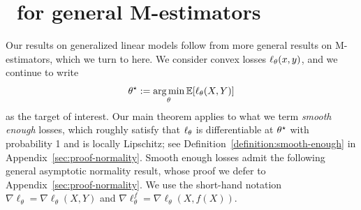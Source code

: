 
\newcommand{\lipobj}{M}

\section{\ppipptitle~for general M-estimators}
\label{sec:ppipp-m-estimation}





Our results on generalized linear models follow from more general
results on M-estimators, which we turn to here. We consider convex
losses $\ell_\theta(x, y)$, and we continue to write
\begin{equation*}
  \theta^\star := \operatorname*{arg\,min}_\theta \mathbb{E} [\ell_\theta(X,Y)]
\end{equation*}
as the target of interest.
%
Our main theorem applies to what we term \emph{smooth enough} losses, which
roughly satisfy that $\ell_\theta$ is differentiable at $\theta^\star$ with
probability 1 and is locally Lipschitz; see
Definition~\ref{definition:smooth-enough} in
Appendix~\ref{sec:proof-normality}.
%
%
Smooth enough losses admit the following general asymptotic normality
result, whose proof we defer to Appendix~\ref{sec:proof-normality}. We use
the short-hand notation $\nabla\ell_{\theta} = \nabla\ell_{\theta}(X,Y)$ and
$\nabla \ell_{\theta}^f = \nabla \ell_{\theta}(X,f(X))$.

